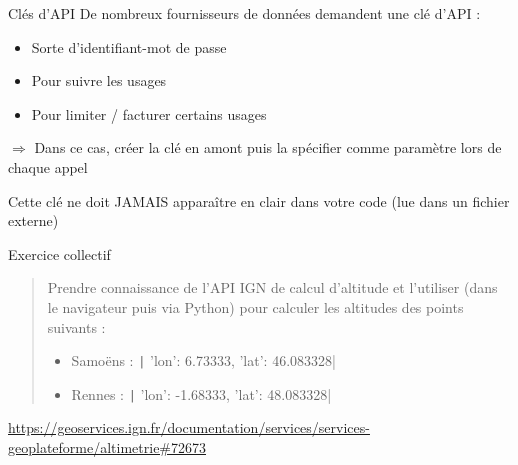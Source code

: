 \documentclass[10pt]{beamer}
\begin{document}
\begin{frame}{Clés d'API}
  De nombreux fournisseurs de données demandent une clé d'API :
  \begin{itemize}
    \item Sorte d'identifiant-mot de passe
    \item Pour suivre les usages
    \item Pour limiter / facturer certains usages
  \end{itemize}

  $\Rightarrow$ Dans ce cas, créer la clé en amont puis la spécifier comme paramètre lors de chaque appel

  \pause

  \alert{Cette clé ne doit JAMAIS apparaître en clair dans votre code (lue dans un fichier externe)}

\end{frame}


\begin{frame}{Exercice collectif}
  \begin{quote}
    Prendre connaissance de l'API IGN de calcul d'altitude et l'utiliser (dans le navigateur puis via Python) pour calculer les altitudes des points suivants :
    \begin{itemize}
      \item Samoëns : \texttt| {'lon': 6.73333, 'lat': 46.083328}|
      \item Rennes : \texttt| {'lon': -1.68333, 'lat': 48.083328}|
    \end{itemize}
  \end{quote}

  {\centering
    \url{https://geoservices.ign.fr/documentation/services/services-geoplateforme/altimetrie\#72673}
  }

\end{frame}
\end{document}
